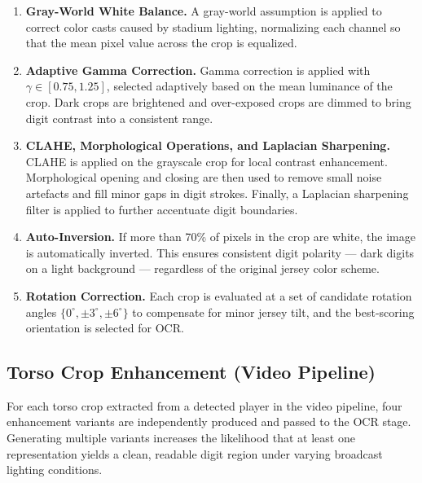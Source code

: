 \begin{enumerate}

    \item \textbf{Gray-World White Balance.}
    A gray-world assumption is applied to correct color casts caused
    by stadium lighting, normalizing each channel so that the mean
    pixel value across the crop is equalized.

    \item \textbf{Adaptive Gamma Correction.}
    Gamma correction is applied with $\gamma \in [0.75, 1.25]$,
    selected adaptively based on the mean luminance of the crop.
    Dark crops are brightened and over-exposed crops are dimmed to
    bring digit contrast into a consistent range.

    \item \textbf{CLAHE, Morphological Operations, and Laplacian
    Sharpening.}
    CLAHE is applied on the grayscale crop for local contrast
    enhancement. Morphological opening and closing are then used
    to remove small noise artefacts and fill minor gaps in digit
    strokes. Finally, a Laplacian sharpening filter is applied to
    further accentuate digit boundaries.

    \item \textbf{Auto-Inversion.}
    If more than 70\% of pixels in the crop are white, the image
    is automatically inverted. This ensures consistent digit
    polarity --- dark digits on a light background --- regardless
    of the original jersey color scheme.

    \item \textbf{Rotation Correction.}
    Each crop is evaluated at a set of candidate rotation angles
    $\{0^{\circ}, \pm3^{\circ}, \pm6^{\circ}\}$ to compensate
    for minor jersey tilt, and the best-scoring orientation is
    selected for OCR.
\end{enumerate}

\subsection{Torso Crop Enhancement (Video Pipeline)}

For each torso crop extracted from a detected player in the video
pipeline, four enhancement variants are independently produced and
passed to the OCR stage. Generating multiple variants increases the
likelihood that at least one representation yields a clean, readable
digit region under varying broadcast lighting conditions.


